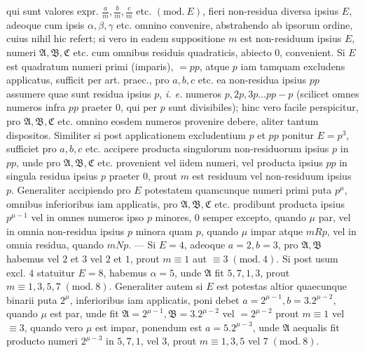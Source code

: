 qui sunt valores expr. \(\frac am,\allowbreak \frac bm,\allowbreak \frac cm\) etc. \((\mathrm{mod.}\ E)\), fieri non-residua diversa ipsius \(E\), adeoque cum ipsis \(\alpha,\allowbreak \beta,\allowbreak \gamma\) etc. omnino convenire, abstrahendo ab ipsorum ordine, cuius nihil hic refert; si vero in eadem suppositione \(m\) est non-residuum ipsius \(E\), numeri \(\mathfrak A,\allowbreak \mathfrak B,\allowbreak \mathfrak C\) etc. cum omnibus residuis quadraticis, abiecto \(0\), convenient. Si \(E\) est quadratum numeri primi (imparis), \(=pp\), atque \(p\) iam tamquam excludens applicatus, sufficit per art. praec., pro \(a,\allowbreak b,\allowbreak c\) etc. ea non-residua ipsius \(pp\) assumere quae sunt residua ipsius \(p\), \textit{i. e.} numeros \(p,\allowbreak 2p,\allowbreak 3p\ldots pp-p\) (scilicet omnes numeros infra \(pp\) praeter \(0\), qui per \(p\) sunt divisibiles); hinc vero facile perspicitur, pro \(\mathfrak A,\allowbreak \mathfrak B,\allowbreak \mathfrak C\) etc. omnino eosdem numeros provenire debere, aliter tantum dispositos. Similiter si post applicationem excludentium \(p\) et \(pp\) ponitur \(E=p^3\), sufficiet pro \(a,\allowbreak b,\allowbreak c\) etc. accipere producta singulorum non-residuorum ipsius \(p\) in \(pp\), unde pro \(\mathfrak A,\allowbreak \mathfrak B,\allowbreak \mathfrak C\) etc. provenient vel iidem numeri, vel producta ipsius \(pp\) in singula residua ipsius \(p\) praeter \(0\), prout \(m\) est residuum vel non-residuum ipsius \(p\). Generaliter accipiendo pro \(E\) potestatem quamcunque numeri primi puta \(p^\mu\), omnibus inferioribus iam applicatis, pro \(\mathfrak A,\allowbreak \mathfrak B,\allowbreak \mathfrak C\) etc. prodibunt producta ipsius \(p^{\mu-1}\) vel in omnes numeros ipso \(p\) minores, \(0\) semper excepto, quando \(\mu\) par, vel in omnia non-residua ipsius \(p\) minora quam \(p\), quando \(\mu\) impar atque \(mRp\), vel in omnia residua, quando \(mNp\). — Si \(E=4\), adeoque \(a=2,\allowbreak b=3\), pro \(\mathfrak A,\allowbreak \mathfrak B\) habemus vel \(2\) et \(3\) vel \(2\) et \(1\), prout \(m\equiv1\) aut \(\equiv3\; (\mathrm{mod}.\ 4)\). Si post usum excl. \(4\) statuitur \(E=8\), habemus \(\alpha=5\), unde \(\mathfrak A\) fit \(5,\allowbreak 7,\allowbreak 1,\allowbreak 3\), prout \(m\equiv1,\allowbreak 3,\allowbreak 5,\allowbreak 7\; (\mathrm{mod}.\ 8)\). Generaliter autem si \(E\) est potestas altior quaecunque binarii puta \(2^\mu\), inferioribus iam applicatis, poni debet \(a=2^{\mu-1},\allowbreak b=3.2^{\mu-2}\), quando \(\mu\) est par, unde fit \(\mathfrak A=2^{\mu-1},\allowbreak \mathfrak B=3.2^{\mu-2}\) vel \(=2^{\mu-2}\) prout \(m\equiv1\) vel \(\equiv3\), quando vero \(\mu\) est impar, ponendum est \(a=5.2^{\mu-3}\), unde \(\mathfrak A\) aequalis fit producto numeri \(2^{\mu-3}\) in \(5,\allowbreak 7,\allowbreak 1\), vel \(3\), prout \(m\equiv1,\allowbreak 3,\allowbreak 5\) vel \(7\; (\mathrm{mod}.\ 8)\).

